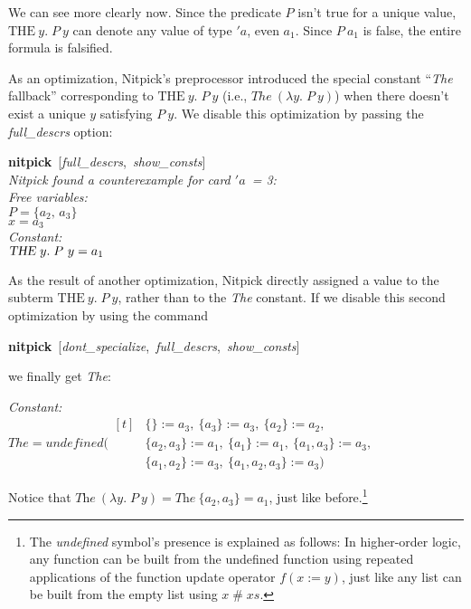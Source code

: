 \documentclass[a4paper,12pt]{article}
\def\undef{\textit{undefined}}
\begin{document}
We can see more clearly now. Since the predicate $P$ isn't true for a unique
value, $\textrm{THE}~y.\;P~y$ can denote any value of type $'a$, even
$a_1$. Since $P~a_1$ is false, the entire formula is falsified.

As an optimization, Nitpick's preprocessor introduced the special constant
``\textit{The} fallback'' corresponding to $\textrm{THE}~y.\;P~y$ (i.e.,
$\mathit{The}~(\lambda y.\;P~y)$) when there doesn't exist a unique $y$
satisfying $P~y$. We disable this optimization by passing the
\textit{full\_descrs} option:

\prew
\textbf{nitpick}~[\textit{full\_descrs},\, \textit{show\_consts}] \\[2\smallskipamount]
\slshape
Nitpick found a counterexample for \textit{card} $'a$~= 3: \\[2\smallskipamount]
\hbox{}\qquad Free variables: \nopagebreak \\
\hbox{}\qquad\qquad $P = \{a_2,\, a_3\}$ \\
\hbox{}\qquad\qquad $x = a_3$ \\
\hbox{}\qquad Constant: \nopagebreak \\
\hbox{}\qquad\qquad $\hbox{\slshape THE}~y.\;P~y = a_1$
\postw

As the result of another optimization, Nitpick directly assigned a value to the
subterm $\textrm{THE}~y.\;P~y$, rather than to the \textit{The} constant. If we
disable this second optimization by using the command

\prew
\textbf{nitpick}~[\textit{dont\_specialize},\, \textit{full\_descrs},\,
\textit{show\_consts}]
\postw

we finally get \textit{The}:

\prew
\slshape Constant: \nopagebreak \\
\hbox{}\qquad $\mathit{The} = \undef{}
    (\!\begin{aligned}[t]%
    & \{\} := a_3,\> \{a_3\} := a_3,\> \{a_2\} := a_2, \\[-2pt] %
    & \{a_2, a_3\} := a_1,\> \{a_1\} := a_1,\> \{a_1, a_3\} := a_3, \\[-2pt]
    & \{a_1, a_2\} := a_3,\> \{a_1, a_2, a_3\} := a_3)\end{aligned}$
\postw

Notice that $\textit{The}~(\lambda y.\;P~y) = \textit{The}~\{a_2, a_3\} = a_1$,
just like before.\footnote{The \undef{} symbol's presence is explained as
follows: In higher-order logic, any function can be built from the undefined
function using repeated applications of the function update operator $f(x :=
y)$, just like any list can be built from the empty list using $x \mathbin{\#}
xs$.}
\end{document}
